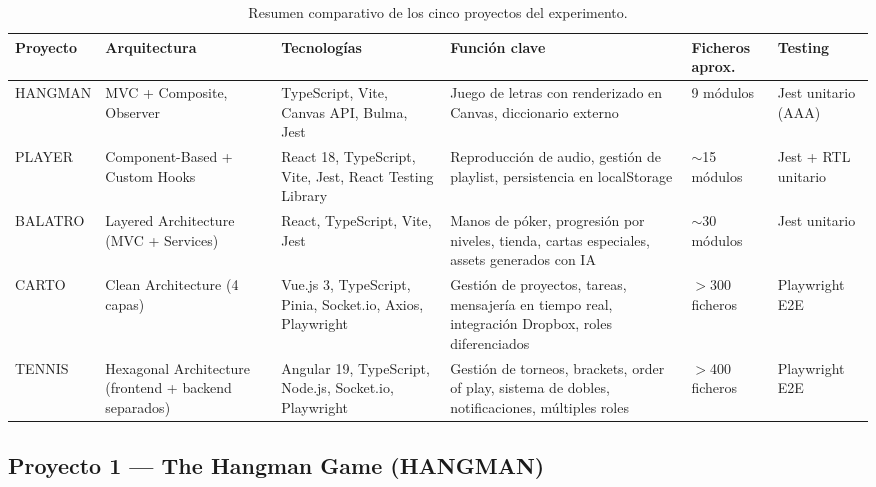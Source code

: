\begin{table}[H]
\centering
\small
\renewcommand{\arraystretch}{1.3}

\begin{tabularx}{\textwidth}{|p{1.5cm}|p{2.5cm}|Y|Y|p{1.5cm}|p{2cm}|}
\hline
\textbf{Proyecto} & \textbf{Arquitectura} & \textbf{Tecnologías} & \textbf{Función clave} & \textbf{Ficheros aprox.} & \textbf{Testing} \\
\hline

\ac{HANGMAN} &
\ac{MVC} + Composite, Observer &
TypeScript, Vite, Canvas \ac{API}, Bulma, Jest &
Juego de letras con renderizado en Canvas, diccionario externo &
9 módulos &
Jest unitario (AAA) \\
\hline

\ac{PLAYER} &
Component-Based + Custom Hooks &
React 18, TypeScript, Vite, Jest, React Testing Library &
Reproducción de audio, gestión de playlist, persistencia en localStorage &
$\sim$15 módulos &
Jest + RTL unitario \\
\hline

\ac{BALATRO} &
Layered Architecture (MVC + Services) &
React, TypeScript, Vite, Jest &
Manos de póker, progresión por niveles, tienda, cartas especiales, assets generados con IA &
$\sim$30 módulos &
Jest unitario \\
\hline

\ac{CARTO} &
Clean Architecture (4 capas) &
Vue.js 3, TypeScript, Pinia, Socket.io, Axios, Playwright &
Gestión de proyectos, tareas, mensajería en tiempo real, integración Dropbox, roles diferenciados &
$>$300 ficheros &
Playwright E2E \\
\hline

\ac{TENNIS} &
Hexagonal Architecture (frontend + backend separados) &
Angular 19, TypeScript, Node.js, Socket.io, Playwright &
Gestión de torneos, brackets, order of play, sistema de dobles, notificaciones, múltiples roles &
$>$400 ficheros &
Playwright E2E \\
\hline

\end{tabularx}

\caption{Resumen comparativo de los cinco proyectos del experimento.}
\label{tab:proyectos-resumen}
\end{table}

\subsection{Proyecto 1 — The Hangman Game (\ac{HANGMAN})} \label{subsec:p1-hangman}

